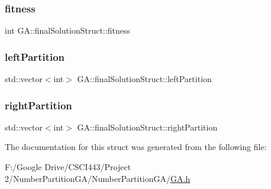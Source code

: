 \subsubsection{\texorpdfstring{fitness}{fitness}}
{\footnotesize\ttfamily int G\+A\+::final\+Solution\+Struct\+::fitness}

\hypertarget{struct_g_a_1_1final_solution_struct_aedc052fa2f16ac65ef65b23692177ab9}{}\label{struct_g_a_1_1final_solution_struct_aedc052fa2f16ac65ef65b23692177ab9} 
\subsubsection{\texorpdfstring{left\+Partition}{leftPartition}}
{\footnotesize\ttfamily std\+::vector$<$int$>$ G\+A\+::final\+Solution\+Struct\+::left\+Partition}

\hypertarget{struct_g_a_1_1final_solution_struct_a61ec4bab473d91916ca5fee656fb9a15}{}\label{struct_g_a_1_1final_solution_struct_a61ec4bab473d91916ca5fee656fb9a15} 
\subsubsection{\texorpdfstring{right\+Partition}{rightPartition}}
{\footnotesize\ttfamily std\+::vector$<$int$>$ G\+A\+::final\+Solution\+Struct\+::right\+Partition}



The documentation for this struct was generated from the following file\+:\begin{DoxyCompactItemize}
\item 
F\+:/\+Google Drive/\+C\+S\+C\+I443/\+Project 2/\+Number\+Partition\+G\+A/\+Number\+Partition\+G\+A/\hyperlink{_g_a_8h}{G\+A.\+h}\end{DoxyCompactItemize}
